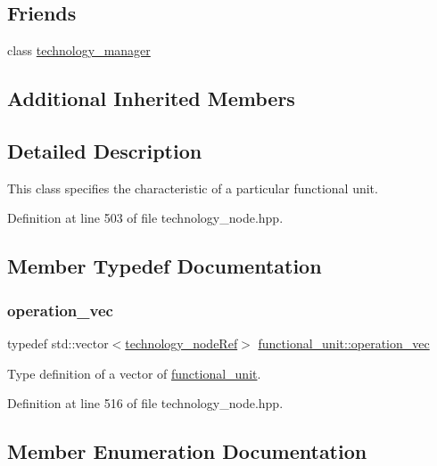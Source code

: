 \subsection*{Friends}
\begin{DoxyCompactItemize}
\item 
class \hyperlink{structfunctional__unit_a7012231228df7578c7338a9773121f88}{technology\+\_\+manager}
\end{DoxyCompactItemize}
\subsection*{Additional Inherited Members}


\subsection{Detailed Description}
This class specifies the characteristic of a particular functional unit. 

Definition at line 503 of file technology\+\_\+node.\+hpp.



\subsection{Member Typedef Documentation}
\mbox{\label{structfunctional__unit_a95afca234ddcc2e13d56d6e5eb53557a}} 
\subsubsection{\texorpdfstring{operation\+\_\+vec}{operation\_vec}}
{\footnotesize\ttfamily typedef std\+::vector$<$\hyperlink{technology__node_8hpp_a33dd193b7bd6b987bf0d8a770a819fa7}{technology\+\_\+node\+Ref}$>$ \hyperlink{structfunctional__unit_a95afca234ddcc2e13d56d6e5eb53557a}{functional\+\_\+unit\+::operation\+\_\+vec}}



Type definition of a vector of \hyperlink{structfunctional__unit}{functional\+\_\+unit}. 



Definition at line 516 of file technology\+\_\+node.\+hpp.



\subsection{Member Enumeration Documentation}
\mbox{\label{structfunctional__unit_abf715beb1f09a03995234a68c1478bfe}} 
